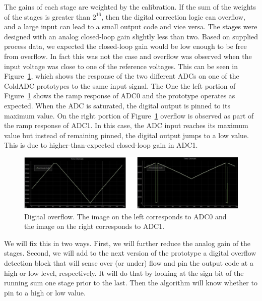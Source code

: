 \label{sec:5.9}


The gains of each stage are weighted by the calibration. If the sum of the weights of the stages is greater than $2^{16}$, then the digital correction logic can overflow, and a large input can lead to a small output code and vice versa. The stages were designed with an analog closed-loop gain slightly less than two. Based on supplied process data, we expected the closed-loop gain would be low enough to be free from overflow. In fact this was not the case and overflow was observed when the input voltage was close to one of the reference voltages. This can be seen in Figure~\ref{fig:adcoverflow}, which shows the response of the two different ADCs on one of the ColdADC prototypes to the same input signal. The One the left portion of Figure~\ref{fig:adcoverflow} shows the ramp response of ADC0 and the prototype operates as expected. When the ADC is saturated, the digital output is pinned to its maximum value. On the right portion of Figure~\ref{fig:adcoverflow} overflow is observed as part of the ramp response of ADC1. In this case, the ADC input reaches its maximum value but instead of remaining pinned, the digital output jumps to a low value. This is due to higher-than-expected closed-loop gain in ADC1.
\begin{figure}[htb]
\centering
\begin{center}
\includegraphics[width=1.0\textwidth]{figures/ADCOverflow.png}
\end{center}
\caption{Digital overflow. The image on the left corresponds to ADC0 and the image on the right corresponds to ADC1.}
\label{fig:adcoverflow}
\end{figure}

We will fix this in two ways. First, we will further reduce the analog gain of the stages. Second, we will add to the next version of the prototype a digital overflow detection block that will sense over (or under) flow and pin the output code at a high or low level, respectively. It will do that by looking at the sign bit of the running sum one stage prior to the last. Then the algorithm will know whether to pin to a high or low value.
